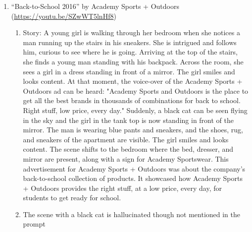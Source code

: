 \begin{enumerate}
    \item ``Back-to-School 2016'' by Academy Sports + Outdoors (\url{https://youtu.be/SZwWT5lnHf8}) 
    \begin{enumerate}
        \item Story: A young girl is walking through her bedroom when she notices a man running up the stairs in his sneakers. She is intrigued and follows him, curious to see where he is going. Arriving at the top of the stairs, she finds a young man standing with his backpack. Across the room, she sees a girl in a dress standing in front of a mirror. The girl smiles and looks content. At that moment, the voice-over of the Academy Sports + Outdoors ad can be heard: "Academy Sports and Outdoors is the place to get all the best brands in thousands of combinations for back to school. Right stuff, low price, every day." Suddenly, a black cat can be seen flying in the sky and the girl in the tank top is now standing in front of the mirror. The man is wearing blue pants and sneakers, and the shoes, rug, and sneakers of the apartment are visible. The girl smiles and looks content. The scene shifts to the bedroom where the bed, dresser, and mirror are present, along with a sign for Academy Sportswear. This advertisement for Academy Sports + Outdoors was about the company's back-to-school collection of products. It showcased how Academy Sports + Outdoors provides the right stuff, at a low price, every day, for students to get ready for school.

        \item The scene with a black cat is hallucinated though not mentioned in the prompt

    \end{enumerate}
    

\end{enumerate}
